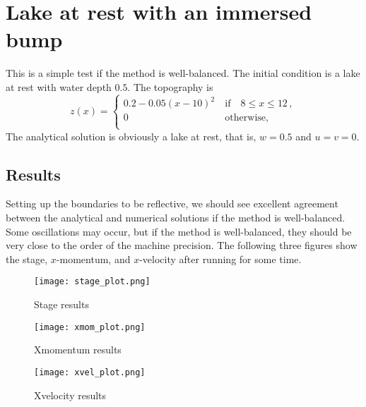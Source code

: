 
\section{Lake at rest with an immersed bump}

This is a simple test if the method is well-balanced. 
The initial condition is a lake at rest with water depth $0.5$. The topography is
\begin{equation}
z(x)= \left\{ \begin{array}{ll}
 0.2-0.05\left(x-10\right)^2& ~\textrm{if}\quad 8 \leq x \leq 12\,,\\
 0& ~\textrm{otherwise,}\\
\end{array} \right.
\end{equation}
The analytical solution is obviously a lake at rest, that is, $w=0.5$ and $u=v=0$.


\subsection{Results}

Setting up the boundaries to be reflective, we should see excellent agreement between the analytical and numerical solutions if the method is well-balanced. Some oscillations may occur, but if the method is well-balanced, they should be very close to the order of the machine precision. The following three figures show the stage, $x$-momentum, and $x$-velocity after running \anuga{} for some time.

\begin{figure}
\begin{center}
\texttt{[image: stage\_plot.png]}
\end{center}
\caption{Stage results}
\end{figure}


\begin{figure}
\begin{center}
\texttt{[image: xmom\_plot.png]}
\end{center}
\caption{Xmomentum results}
\end{figure}


\begin{figure}
\begin{center}
\texttt{[image: xvel\_plot.png]}
\end{center}
\caption{Xvelocity results}
\end{figure}


\endinput
